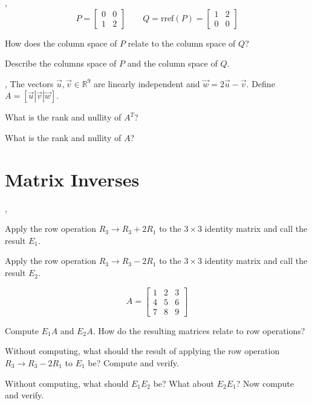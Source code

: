 \documentclass[letter]{article}
\newcommand{\R}{\mathbb{R}}
\newcommand{\rref}{\mathrm{rref}}
\newcommand{\rank}{\mathrm{rank}}
\newcommand{\nnul}{\mathrm{nullity}}
\newcommand{\mat}[1]{\begin{bmatrix}#1\end{bmatrix}}
\renewcommand{\emph}[1]{{\color{defcolor} \textbf{\textit{##1}}}}
\begin{document}
\sep
\[
	P=\mat{0&0\\1&2}\qquad Q=\rref(P)=\mat{1&2\\0&0}
\]
\begin{Enum}
	\item How does the column space of $P$ relate to the column space of $Q$?
	\item Describe the columns space of $P$ and the column space of $Q$.
\end{Enum}


\sep
The vectors $\vec u,\vec v\in\R^9$ are linearly independent and $\vec w=2\vec u-\vec v$.
Define $A=[\vec u|\vec v|\vec w]$.
\begin{Enum}
	\item What is the rank and nullity of $A^T$?
	\item What is the rank and nullity of $A$?
\end{Enum}

\newpage

\section*{Matrix Inverses}

	\vspace{-.5cm}
	\sep
	\vspace{-.8cm}
	\begin{Enum}
		\item Apply the row operation $R_3\to R_3+2R_1$ to the $3\times 3$ identity
		matrix and call the result $E_1$.
		\item Apply the row operation $R_3\to R_3-2R_1$ to the $3\times 3$ identity
		matrix and call the result $E_2$.
	\end{Enum}

	\vspace{-.8cm}

	\[
		A=\mat{1&2&3\\4&5&6\\7&8&9}
	\]
	\begin{Enum}[resume]
		\item Compute $E_1A$ and $E_2A$.  How do the resulting matrices relate to row
		operations?
		\item Without computing, what should the result of applying the row
		operation $R_3\to R_3-2R_1$ to $E_1$ be?  Compute and verify.
		\item Without computing, what should $E_1E_2$ be?  What about $E_2E_1$?
		Now compute and verify.
	\end{Enum}
\end{document}

